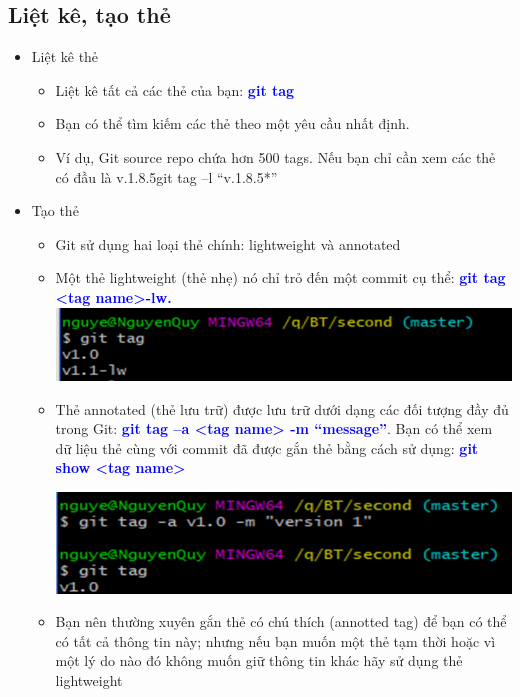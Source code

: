 \documentclass[12pt,a4paper]{report}
\begin{document}
\subsection{Liệt kê, tạo thẻ}
\begin{itemize}
\item Liệt kê thẻ
	\begin{itemize}
		\item Liệt kê tất cả các thẻ của bạn: \textcolor{blue}{\bf git tag}
		\item Bạn có thể tìm kiếm các thẻ theo một yêu cầu nhất định. 
		\item Ví dụ, Git source repo chứa hơn 500 tags. Nếu bạn chỉ cần xem các thẻ có đầu là v.1.8.5git tag –l “v.1.8.5*”
	\end{itemize}
\item Tạo thẻ
	\begin{itemize}
		\item Git sử dụng hai loại thẻ chính: lightweight và annotated
		\item Một thẻ lightweight (thẻ nhẹ) nó chỉ trỏ đến một commit cụ thể: \textcolor{blue}{\bf git tag <tag name>-lw.}
	\includegraphics[width=0.8\linewidth]{screenshot042}

	\label{fig:screenshot042}

		\item Thẻ annotated (thẻ lưu trữ) được lưu trữ dưới dạng các đối tượng đầy đủ trong Git: \textcolor{blue}{\bf git tag –a <tag name> -m “message”}. Bạn có thể xem dữ liệu thẻ cùng với commit đã được gắn thẻ bằng cách sử dụng: \textcolor{blue}{\bf git show <tag name>}

	\includegraphics[width=0.8\linewidth]{screenshot043}

	\label{fig:screenshot043}

		\item Bạn nên thường xuyên gắn thẻ có chú thích (annotted tag) để bạn có thể có tất cả thông tin này; nhưng nếu bạn muốn một thẻ tạm thời hoặc vì một lý do nào đó không muốn giữ thông tin khác hãy sử dụng thẻ lightweight
\end{itemize}
\end{itemize}
\end{document}
